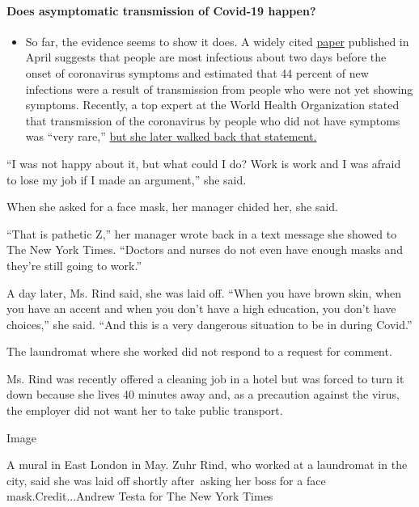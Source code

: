 \begin{itemize}
{  \paragraph{Does asymptomatic transmission of Covid-19
  happen?}\label{does-asymptomatic-transmission-of-covid-19-happen}}

  \begin{itemize}
  \tightlist
  \item
    So far, the evidence seems to show it does. A widely cited
    \href{https://www.nature.com/articles/s41591-020-0869-5}{paper}
    published in April suggests that people are most infectious about
    two days before the onset of coronavirus symptoms and estimated that
    44 percent of new infections were a result of transmission from
    people who were not yet showing symptoms. Recently, a top expert at
    the World Health Organization stated that transmission of the
    coronavirus by people who did not have symptoms was ``very rare,''
    \href{https://www.nytimes.com/2020/06/09/world/coronavirus-updates.html?action=click\&pgtype=Article\&state=default\&region=MAIN_CONTENT_3\&context=storylines_faq\#link-1f302e21}{but
    she later walked back that statement.}
  \end{itemize}
\end{itemize}

``I was not happy about it, but what could I do? Work is work and I was
afraid to lose my job if I made an argument,'' she said.

When she asked for a face mask, her manager chided her, she said.

``That is pathetic Z,'' her manager wrote back in a text message she
showed to The New York Times. ``Doctors and nurses do not even have
enough masks and they're still going to work.''

A day later, Ms. Rind said, she was laid off. ``When you have brown
skin, when you have an accent and when you don't have a high education,
you don't have choices,'' she said. ``And this is a very dangerous
situation to be in during Covid.''

The laundromat where she worked did not respond to a request for
comment.

Ms. Rind was recently offered a cleaning job in a hotel but was forced
to turn it down because she lives 40 minutes away and, as a precaution
against the virus, the employer did not want her to take public
transport.

Image

A mural in East London in May. Zuhr Rind, who worked at a laundromat in
the city, said she was laid off shortly after~asking her boss for a face
mask.Credit...Andrew Testa for The New York Times

